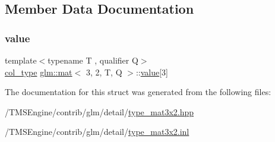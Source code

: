 \subsection{Member Data Documentation}
\mbox{\label{structglm_1_1mat_3_013_00_012_00_01_t_00_01_q_01_4_a49358f69d92f2817e5ee764a5ae2cc8f}} 
\subsubsection{\texorpdfstring{value}{value}}
{\footnotesize\ttfamily template$<$typename T , qualifier Q$>$ \\
\hyperlink{structglm_1_1mat_3_013_00_012_00_01_t_00_01_q_01_4_aa610dcaaae528e1eea8bdaaa435ad3a4}{col\+\_\+type} \hyperlink{structglm_1_1mat}{glm\+::mat}$<$ 3, 2, T, Q $>$\+::\hyperlink{_s_d_l__opengl__glext_8h_a8ad81492d410ff2ac11f754f4042150f}{value}\mbox{[}3\mbox{]}\hspace{0.3cm}{\ttfamily [private]}}



The documentation for this struct was generated from the following files\+:\begin{DoxyCompactItemize}
\item 
/\+T\+M\+S\+Engine/contrib/glm/detail/\hyperlink{type__mat3x2_8hpp}{type\+\_\+mat3x2.\+hpp}\item 
/\+T\+M\+S\+Engine/contrib/glm/detail/\hyperlink{type__mat3x2_8inl}{type\+\_\+mat3x2.\+inl}\end{DoxyCompactItemize}
